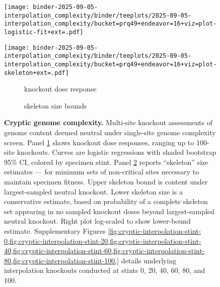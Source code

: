 \begin{figure}

\begin{minipage}{\linewidth}
\centering
\begin{minipage}{0.4\linewidth}
\texttt{[image: binder-2025-09-05-interpolation\_complexity/binder/teeplots/2025-09-05-interpolation\_complexity/bucket=prq49+endeavor=16+viz=plot-logistic-fit+ext=.pdf]}
\end{minipage}%
\begin{minipage}{0.6\linewidth}
\texttt{[image: binder-2025-09-05-interpolation\_complexity/binder/teeplots/2025-09-05-interpolation\_complexity/bucket=prq49+endeavor=16+viz=plot-skeleton+ext=.pdf]}
\end{minipage}
\end{minipage}

\vspace{-1ex}\textsc{}

\begin{minipage}{\linewidth}
\centering
\begin{subfigure}[t]{0.4\linewidth}
\caption{\footnotesize knockout dose response}
\label{fig:cryptic:logistic}
\end{subfigure}%
\begin{subfigure}[t]{0.6\linewidth}
\caption{\footnotesize skeleton size bounds}
\label{fig:cryptic:skeleton}
\end{subfigure}
\end{minipage}

\caption{
\textbf{Cryptic genome complexity.}
\footnotesize
Multi-site knockout assessments of genome content deemed neutral under single-site genome complexity screen.
Panel \ref{fig:cryptic:logistic} shows knockout dose responses, ranging up to 100-site knockouts.
Curves are logistic regressions with shaded bootstrap 95\% CI, colored by specimen stint.
Panel \ref{fig:cryptic:skeleton} reports ``skeleton'' size estimates --- for minimum sets of non-critical sites necessary to maintain specimen fitness.
Upper skeleton bound is content under largest-sampled neutral knockout.
Lower skeleton size is a conservative estimate, based on probability of a complete skeleton set appearing in no sampled knockout doses beyond largest-sampled neutral knockout.
Right plot log-scaled to show lower-bound estimate.
Supplementary Figures \cref{fig:cryptic-interpolation-stint-0,fig:cryptic-interpolation-stint-20,fig:cryptic-interpolation-stint-40,fig:cryptic-interpolation-stint-60,fig:cryptic-interpolation-stint-80,fig:cryptic-interpolation-stint-100,} details underlying interpolation knockouts conducted at stints 0, 20, 40, 60, 80, and 100.
}
\label{fig:cryptic}

\end{figure}
